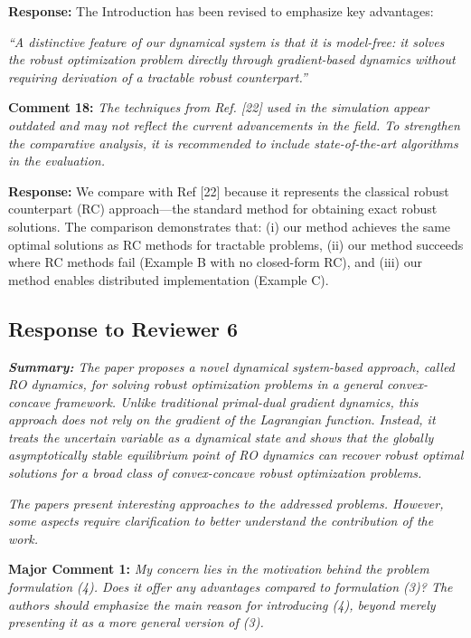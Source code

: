 \documentclass[journal,twoside,web]{ieeecolor}
\begin{document}
\noindent\textbf{Response:} The Introduction has been revised to emphasize key advantages:

{\color{revisionblue}\textit{``A distinctive feature of our dynamical system is that it is \emph{model-free}: it solves the robust optimization problem directly through gradient-based dynamics without requiring derivation of a tractable robust counterpart.''}}

\vspace{0.5em}
\noindent\textbf{Comment 18:} \textit{The techniques from Ref. [22] used in the simulation appear outdated and may not reflect the current advancements in the field. To strengthen the comparative analysis, it is recommended to include state-of-the-art algorithms in the evaluation.}

\noindent\textbf{Response:} We compare with Ref [22] because it represents the classical robust counterpart (RC) approach---the standard method for obtaining exact robust solutions. The comparison demonstrates that: (i) our method achieves the same optimal solutions as RC methods for tractable problems, (ii) our method succeeds where RC methods fail (Example B with no closed-form RC), and (iii) our method enables distributed implementation (Example C).

\newpage
\subsection*{Response to Reviewer 6}

\noindent\textit{\textbf{Summary:} The paper proposes a novel dynamical system-based approach, called RO dynamics, for solving robust optimization problems in a general convex-concave framework. Unlike traditional primal-dual gradient dynamics, this approach does not rely on the gradient of the Lagrangian function. Instead, it treats the uncertain variable as a dynamical state and shows that the globally asymptotically stable equilibrium point of RO dynamics can recover robust optimal solutions for a broad class of convex-concave robust optimization problems.}

\vspace{0.5em}
\noindent\textit{The papers present interesting approaches to the addressed problems. However, some aspects require clarification to better understand the contribution of the work.}

\vspace{0.5em}
\noindent\textbf{Major Comment 1:} \textit{My concern lies in the motivation behind the problem formulation (4). Does it offer any advantages compared to formulation (3)? The authors should emphasize the main reason for introducing (4), beyond merely presenting it as a more general version of (3).}
\end{document}
